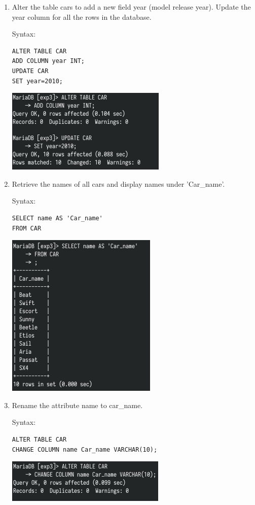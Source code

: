 \documentclass[13pt,oneside]{book}
\begin{document}
\begin{enumerate}
\item
Alter the table cars to add a new field year (model release year). Update
 the year column for all the rows in the database.
 
Syntax:
\begin{verbatim}
ALTER TABLE CAR
ADD COLUMN year INT;
UPDATE CAR
SET year=2010;

\end{verbatim}
\includegraphics[]{img/p3/ss8.png}


\item
Retrieve the names of all cars and display names under 'Car\_name'.
 
Syntax:
\begin{verbatim}
SELECT name AS 'Car_name'
FROM CAR

\end{verbatim}
\includegraphics[]{img/p3/ss9.png}


\item
Rename the attribute name to car\_name.
 
Syntax:
\begin{verbatim}
ALTER TABLE CAR
CHANGE COLUMN name Car_name VARCHAR(10);

\end{verbatim}
\includegraphics[]{img/p3/ss10.png}



\end{enumerate}
\end{document}
